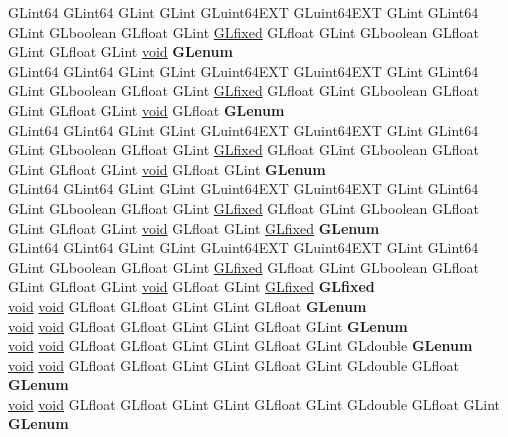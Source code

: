 \begin{DoxyCompactItemize}
\begin{tabbing}
\>GLint64 GLint64 GLint GLint GLuint64EXT GLuint64EXT GLint GLint64 GLint GLboolean GLfloat GLint \hyperlink{glheader_8h_ad6d3fa892df40dedf48ee6d84529ae5e}{GLfixed} GLfloat GLint GLboolean GLfloat GLint GLfloat GLint \hyperlink{interfacevoid}{void} {\bfseries GLenum}\\
\>GLint64 GLint64 GLint GLint GLuint64EXT GLuint64EXT GLint GLint64 GLint GLboolean GLfloat GLint \hyperlink{glheader_8h_ad6d3fa892df40dedf48ee6d84529ae5e}{GLfixed} GLfloat GLint GLboolean GLfloat GLint GLfloat GLint \hyperlink{interfacevoid}{void} GLfloat {\bfseries GLenum}\\
\>GLint64 GLint64 GLint GLint GLuint64EXT GLuint64EXT GLint GLint64 GLint GLboolean GLfloat GLint \hyperlink{glheader_8h_ad6d3fa892df40dedf48ee6d84529ae5e}{GLfixed} GLfloat GLint GLboolean GLfloat GLint GLfloat GLint \hyperlink{interfacevoid}{void} GLfloat GLint {\bfseries GLenum}\\
\>GLint64 GLint64 GLint GLint GLuint64EXT GLuint64EXT GLint GLint64 GLint GLboolean GLfloat GLint \hyperlink{glheader_8h_ad6d3fa892df40dedf48ee6d84529ae5e}{GLfixed} GLfloat GLint GLboolean GLfloat GLint GLfloat GLint \hyperlink{interfacevoid}{void} GLfloat GLint \hyperlink{glheader_8h_ad6d3fa892df40dedf48ee6d84529ae5e}{GLfixed} {\bfseries GLenum}\\
\>GLint64 GLint64 GLint GLint GLuint64EXT GLuint64EXT GLint GLint64 GLint GLboolean GLfloat GLint \hyperlink{glheader_8h_ad6d3fa892df40dedf48ee6d84529ae5e}{GLfixed} GLfloat GLint GLboolean GLfloat GLint GLfloat GLint \hyperlink{interfacevoid}{void} GLfloat GLint \hyperlink{glheader_8h_ad6d3fa892df40dedf48ee6d84529ae5e}{GLfixed} {\bfseries GLfixed}\\
\>\hyperlink{interfacevoid}{void} \hyperlink{interfacevoid}{void} GLfloat GLfloat GLint GLint GLfloat {\bfseries GLenum}\\
\>\hyperlink{interfacevoid}{void} \hyperlink{interfacevoid}{void} GLfloat GLfloat GLint GLint GLfloat GLint {\bfseries GLenum}\\
\>\hyperlink{interfacevoid}{void} \hyperlink{interfacevoid}{void} GLfloat GLfloat GLint GLint GLfloat GLint GLdouble {\bfseries GLenum}\\
\>\hyperlink{interfacevoid}{void} \hyperlink{interfacevoid}{void} GLfloat GLfloat GLint GLint GLfloat GLint GLdouble GLfloat {\bfseries GLenum}\\
\>\hyperlink{interfacevoid}{void} \hyperlink{interfacevoid}{void} GLfloat GLfloat GLint GLint GLfloat GLint GLdouble GLfloat GLint {\bfseries GLenum}\\

\end{tabbing}
\end{DoxyCompactItemize}
